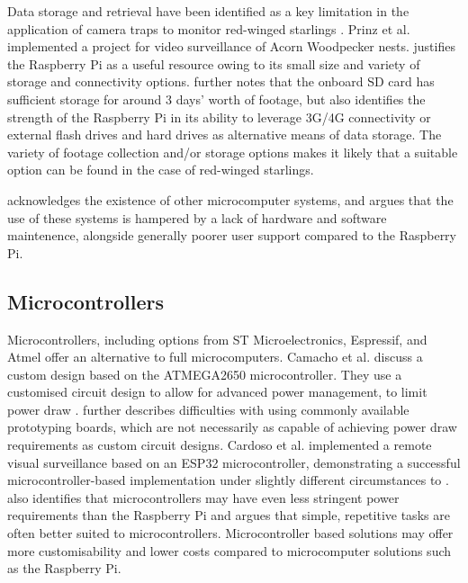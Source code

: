 Data storage and retrieval have been identified as a key limitation in the application of camera traps to monitor red-winged starlings \cite{hofmeyer2024private}. Prinz et al. \cite{prinz2016a} implemented a project for video surveillance of Acorn Woodpecker nests. \cite{prinz2016a} justifies the Raspberry Pi as a useful resource owing to its small size and variety of storage and connectivity options. \cite{prinz2016a} further notes that the onboard SD card has sufficient storage for around 3 days' worth of footage, but also identifies the strength of the Raspberry Pi in its ability to leverage 3G/4G connectivity or external flash drives and hard drives as alternative means of data storage.  The variety of footage collection and/or storage options makes it likely that a suitable option can be found in the case of red-winged starlings.

\cite{jolles2021broad-scale} acknowledges the existence of other microcomputer systems, and argues that the use of these systems is hampered by a lack of hardware and software maintenence, alongside generally poorer user support compared to the Raspberry Pi. 

\subsection{Microcontrollers}

Microcontrollers, including options from ST Microelectronics, Espressif, and Atmel offer an alternative to full microcomputers. Camacho et al. \cite{camacho2017deployment} discuss a custom design based on the ATMEGA2650 microcontroller. They use a customised circuit design to allow for advanced power management, to limit power draw \cite{camacho2017deployment}. \cite{camacho2017deployment} further describes difficulties with using commonly available prototyping boards, which are not necessarily as capable of achieving power draw requirements as custom circuit designs. Cardoso et al. \cite{cardoso2022internet} implemented a remote visual surveillance based on an ESP32 microcontroller, demonstrating a successful microcontroller-based implementation under slightly different circumstances to \cite{camacho2017deployment}. \cite{jolles2021broad-scale} also identifies that microcontrollers may have even less stringent power requirements than the Raspberry Pi and argues that simple, repetitive tasks are often better suited to microcontrollers. Microcontroller based solutions may offer more customisability and lower costs compared to microcomputer solutions such as the Raspberry Pi.

